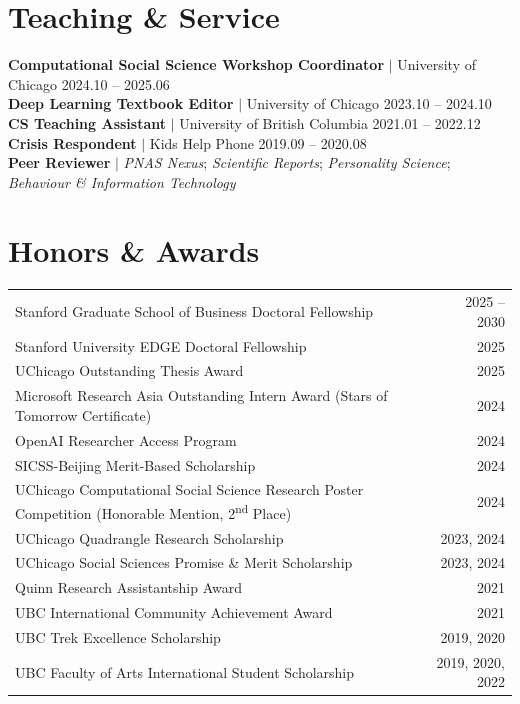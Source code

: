 \documentclass[11pt,letterpaper]{article}
\begin{document}
\section*{Teaching \& Service}

\noindent\textbf{Computational Social Science Workshop Coordinator} $|$ University of Chicago \hfill 2024.10 -- 2025.06\\[0.3em]
\noindent\textbf{Deep Learning Textbook Editor} $|$ University of Chicago \hfill 2023.10 -- 2024.10\\[0.3em]
\noindent\textbf{CS Teaching Assistant} $|$ University of British Columbia \hfill 2021.01 -- 2022.12\\[0.3em]
\noindent\textbf{Crisis Respondent} $|$ Kids Help Phone \hfill 2019.09 -- 2020.08\\[0.3em]
\noindent\textbf{Peer Reviewer} $|$ \textit{PNAS Nexus}; \textit{Scientific Reports}; \textit{Personality Science}; \textit{Behaviour \& Information Technology}

\section*{Honors \& Awards}

\noindent
\begin{tabularx}{\textwidth}{Xr}
Stanford Graduate School of Business Doctoral Fellowship & 2025 -- 2030 \\
Stanford University EDGE Doctoral Fellowship & 2025 \\
UChicago Outstanding Thesis Award & 2025 \\
Microsoft Research Asia Outstanding Intern Award (Stars of Tomorrow Certificate) & 2024 \\
OpenAI Researcher Access Program & 2024 \\
SICSS-Beijing Merit-Based Scholarship & 2024 \\
UChicago Computational Social Science Research Poster Competition (Honorable Mention, 2\textsuperscript{nd} Place) & 2024 \\
UChicago Quadrangle Research Scholarship & 2023, 2024 \\
UChicago Social Sciences Promise \& Merit Scholarship & 2023, 2024 \\
Quinn Research Assistantship Award & 2021 \\
UBC International Community Achievement Award & 2021 \\
UBC Trek Excellence Scholarship & 2019, 2020 \\
UBC Faculty of Arts International Student Scholarship & 2019, 2020, 2022 \\
\end{tabularx}
\end{document}

